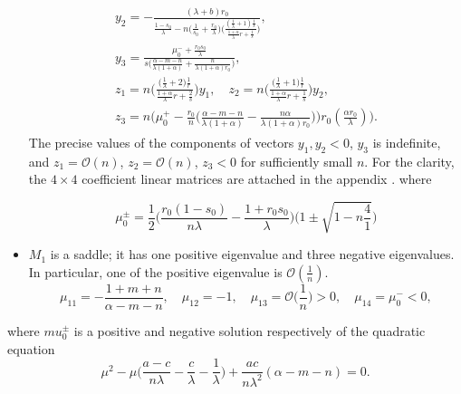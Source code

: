 \documentclass[a4paper,11pt]{article}
\def\BO{{\mathcal{O}}}
\begin{document}
\begin{itemize}
\begin{align*}
\begin{array}{l}
 y_2=-\frac{(\lambda+b)r_0}{\frac{1-s_0}{\lambda} - n\Big(\frac{1}{s_0}+\frac{r_0}{\lambda}\Big)\Big(\frac{(\frac{1}{\lambda}+1)\frac{1}{s}}{ \frac{1+\alpha}{\lambda}r + \frac{1}{s} }\Big) },\\
 y_3=\frac{\mu_0^- +\frac{r_0s_0}{\lambda}}{s\Big(\frac{\alpha-m-n}{\lambda(1+\alpha)} + \frac{n}{\lambda(1+\alpha)r_0}\Big)},\\
 z_1=n\bigg(\frac{\big(\frac{1}{\lambda}+2\big)\frac{1}{r}}{ \frac{1+\alpha}{\lambda}r + \frac{2}{s} }\bigg)y_1, \quad
 z_2=n\bigg(\frac{\big(\frac{1}{\lambda}+1\big)\frac{1}{r}}{ \frac{1+\alpha}{\lambda}r + \frac{1}{s} }\bigg)y_2, \\
 z_3=n\bigg(\mu_0^+-\frac{r_0}{n}\Big(\frac{\alpha-m-n}{\lambda(1+\alpha)} - \frac{n\alpha}{\lambda(1+\alpha)r_0}\Big)\bigg)r_0(\frac{\alpha r_0}{\lambda})\bigg).
 \end{array}
\end{align*}
The precise values of the components of vectors  $y_1,y_2<0$, $y_3$ is indefinite, and $z_1=\BO(n)$, $z_2=\BO(n)$, $z_3<0$ for sufficiently small $n$. For the clarity, the $4\times4$ coefficient linear matrices are attached in the appendix \cite{append.mat}. where  
 
 $$ \mu_0^\pm = \frac{1}{2}\Big(\frac{r_0(1-s_0)}{n\lambda}-\frac{1+r_0s_0}{\lambda}\Big)\Big(1\pm \sqrt{1-n\frac{4}{1}}\Big)$$
 \item $M_1$ is a saddle; it has one positive eigenvalue and three negative eigenvalues. In particular, one of the positive eigenvalue is $\mathcal{O}( \frac{1}{n})$.
\begin{equation}
 \mu_{11}=-\frac{1+m+n}{\alpha-m-n}, \quad \mu_{12}=-1, \quad \mu_{13}=\BO\Big(\frac{1}{n}\Big)>0, \quad \mu_{14}=\mu_0^{-}<0,
\end{equation}
\end{itemize}

\pagebreak
where $mu_0^\pm$ is a positive and negative solution respectively of the quadratic equation
 $$ \mu^2 - \mu\Big(\frac{a-c}{n\lambda}-\frac{c}{\lambda} - \frac{1}{\lambda}\Big) + \frac{ac}{n\lambda^2}(\alpha-m-n)=0.$$ 
\end{document}
